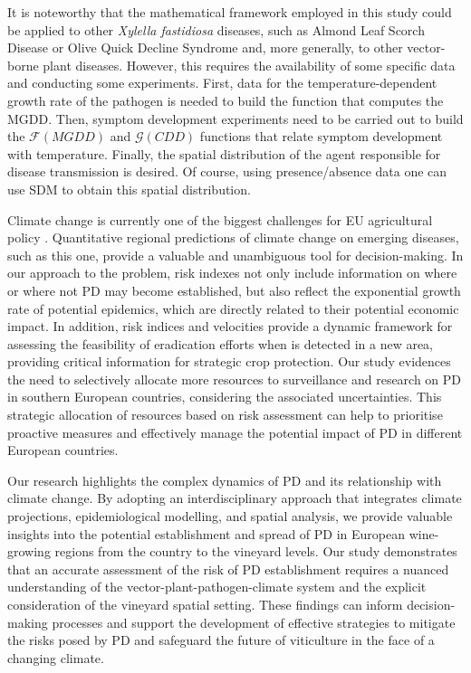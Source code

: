 It is noteworthy that the mathematical framework employed in this study
could be applied to other \textit{Xylella fastidiosa} diseases, such as Almond
Leaf Scorch Disease or Olive Quick Decline Syndrome and, more generally, to
other vector-borne plant diseases. However, this requires the availability of
some specific data and conducting some experiments. First, data for the
temperature-dependent growth rate of the pathogen is needed to build the
function that computes the MGDD. Then, symptom development experiments need to
be carried out to build the $\mathcal{F}(MGDD)$ and $\mathcal{G}(CDD)$
functions that relate symptom development with temperature. Finally, the
spatial distribution of the agent responsible for disease transmission is
desired. Of course, using presence/absence data one can use SDM to obtain this
spatial distribution.

Climate change is currently one of the biggest challenges for EU
agricultural policy \cite{fellmann2018major}. Quantitative regional predictions
of climate change on emerging diseases, such as this one, provide a valuable
and unambiguous tool for decision-making. In our approach to the problem, risk
indexes not only include information on where or where not PD may become
established, but also reflect the exponential growth rate of potential
epidemics, which are directly related to their potential economic impact. In
addition, risk indices and velocities provide a dynamic framework for assessing
the feasibility of eradication efforts when \xf{} is detected in a new area,
providing critical information for strategic crop protection. Our study
evidences the need to selectively allocate more resources to surveillance and
research on PD in southern European countries, considering the associated
uncertainties. This strategic allocation of resources based on risk assessment
can help to prioritise proactive measures and effectively manage the potential
impact of PD in different European countries.

Our research highlights the complex dynamics of PD and its relationship
with climate change. By adopting an interdisciplinary approach that integrates
climate projections, epidemiological modelling, and spatial analysis, we
provide valuable insights into the potential establishment and spread of PD in
European wine-growing regions from the country to the vineyard levels. Our
study demonstrates that an accurate assessment of the risk of PD establishment
requires a nuanced understanding of the vector-plant-pathogen-climate system
and the explicit consideration of the vineyard spatial setting. These findings
can inform decision-making processes and support the development of effective
strategies to mitigate the risks posed by PD and safeguard the future of
viticulture in the face of a changing climate.